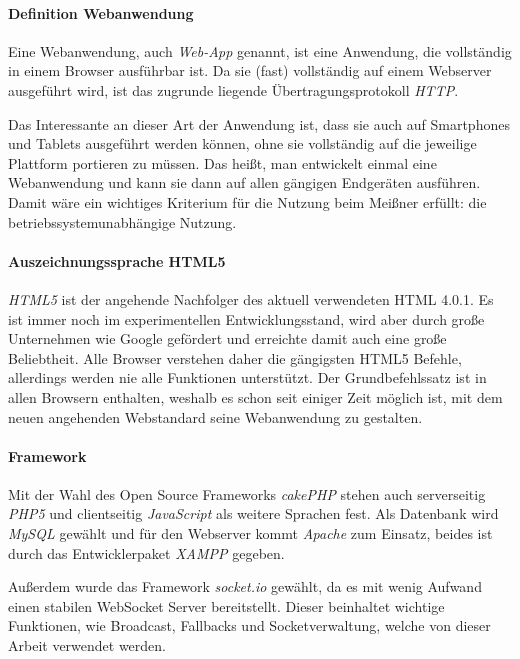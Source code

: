 \paragraph{Definition Webanwendung} 
Eine Webanwendung, auch \emph{Web-App} genannt, ist eine Anwendung, die vollständig in einem Browser ausführbar ist. Da sie (fast) vollständig auf einem Webserver ausgeführt wird, ist das zugrunde liegende Übertragungsprotokoll \emph{HTTP}.\par

Das Interessante an dieser Art der Anwendung ist, dass sie auch auf Smartphones und Tablets ausgeführt werden können, ohne sie vollständig auf die jeweilige Plattform portieren zu müssen. Das heißt, man entwickelt einmal eine Webanwendung und kann sie dann auf allen gängigen Endgeräten ausführen.\\
Damit wäre ein wichtiges Kriterium für die Nutzung beim Meißner erfüllt: die betriebssystemunabhängige Nutzung.

\paragraph{Auszeichnungssprache HTML5}
\emph{HTML5} ist der angehende Nachfolger des aktuell verwendeten HTML 4.0.1. Es ist immer noch im experimentellen Entwicklungsstand, wird aber durch große Unternehmen wie Google gefördert und erreichte damit auch eine große Beliebtheit. Alle Browser verstehen daher die gängigsten HTML5 Befehle, allerdings werden nie alle Funktionen unterstützt. Der Grundbefehlssatz ist in allen Browsern enthalten, weshalb es schon seit einiger Zeit möglich ist, mit dem neuen angehenden Webstandard seine Webanwendung zu gestalten.

\paragraph{Framework}
Mit der Wahl des Open Source Frameworks \emph{cakePHP} \cite{cakePHP} stehen auch serverseitig \emph{PHP5} und clientseitig \emph{JavaScript} als weitere Sprachen fest. Als Datenbank wird \emph{MySQL} gewählt und für den Webserver kommt \emph{Apache} zum Einsatz, beides ist durch das Entwicklerpaket \emph{XAMPP} gegeben.\par

Außerdem  wurde das Framework \emph{socket.io} \cite{socket.io} gewählt, da es mit wenig Aufwand einen stabilen WebSocket Server bereitstellt. Dieser beinhaltet wichtige Funktionen, wie Broadcast, Fallbacks und Socketverwaltung, welche von dieser Arbeit verwendet werden.

